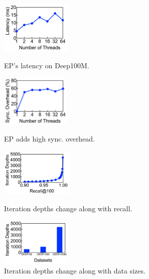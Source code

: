 \begin{figure}[!ht]
\begin{minipage}[t]{0.23\textwidth}
    \centering
    \includegraphics[height=0.98in]{submissions/Minjia2023/figures/insight_edge_wise_latency.pdf}
    \caption{
        {EP's latency on Deep100M.}
    }
    \label{minjia_fig:insight_edge_wise_latency}
\end{minipage}
\hfill
\begin{minipage}[t]{0.23\textwidth}
    \centering
    \includegraphics[height=0.98in]{submissions/Minjia2023/figures/insight_edge_wise_sync_overhead}
    \caption{
        {EP adds high sync. overhead.}
    }
    \label{minjia_fig:insight_edge_wise_sync_overhead}
\end{minipage}
\hfill
\begin{minipage}[t]{0.23\textwidth}
    \centering
    \includegraphics[height=0.9in]{submissions/Minjia2023/figures/insight_NSG_convergence_vs_recall}
    \caption{
        {Iteration depths change along with recall.}
    }
    \label{minjia_fig:insight_NSG_convergence_vs_recall}
\end{minipage}
\hfill
\begin{minipage}[t]{0.23\textwidth}
    \centering
    \includegraphics[height=0.9in]{submissions/Minjia2023/figures/insight_NSG_convergence_vs_dataset_sizes}
    \caption{
        {Iteration depths change along with data sizes.}
    }
    \label{minjia_fig:insight_NSG_convergence_vs_dataset_sizes}
\end{minipage}
\end{figure}

